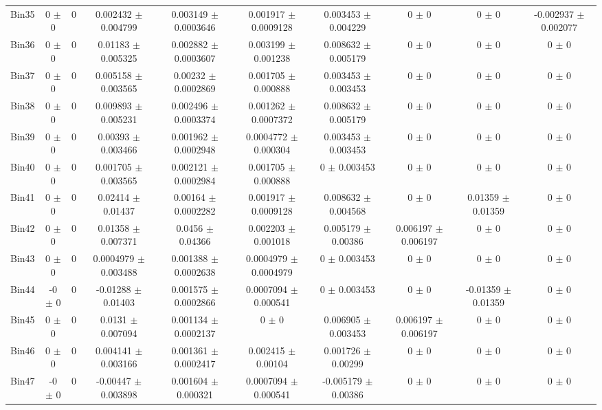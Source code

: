 \begin{tabular}{@{\extracolsep{4pt}}lccccccccc@{}}
     Bin35 & 0 $\pm$ 0 & 0 & 0.002432 $\pm$ 0.004799 & 0.003149 $\pm$ 0.0003646 & 0.001917 $\pm$ 0.0009128 & 0.003453 $\pm$ 0.004229 & 0 $\pm$ 0 & 0 $\pm$ 0 & -0.002937 $\pm$ 0.002077 \\ 
     Bin36 & 0 $\pm$ 0 & 0 & 0.01183 $\pm$ 0.005325 & 0.002882 $\pm$ 0.0003607 & 0.003199 $\pm$ 0.001238 & 0.008632 $\pm$ 0.005179 & 0 $\pm$ 0 & 0 $\pm$ 0 & 0 $\pm$ 0 \\ 
     Bin37 & 0 $\pm$ 0 & 0 & 0.005158 $\pm$ 0.003565 & 0.00232 $\pm$ 0.0002869 & 0.001705 $\pm$ 0.000888 & 0.003453 $\pm$ 0.003453 & 0 $\pm$ 0 & 0 $\pm$ 0 & 0 $\pm$ 0 \\ 
     Bin38 & 0 $\pm$ 0 & 0 & 0.009893 $\pm$ 0.005231 & 0.002496 $\pm$ 0.0003374 & 0.001262 $\pm$ 0.0007372 & 0.008632 $\pm$ 0.005179 & 0 $\pm$ 0 & 0 $\pm$ 0 & 0 $\pm$ 0 \\ 
     Bin39 & 0 $\pm$ 0 & 0 & 0.00393 $\pm$ 0.003466 & 0.001962 $\pm$ 0.0002948 & 0.0004772 $\pm$ 0.000304 & 0.003453 $\pm$ 0.003453 & 0 $\pm$ 0 & 0 $\pm$ 0 & 0 $\pm$ 0 \\ 
     Bin40 & 0 $\pm$ 0 & 0 & 0.001705 $\pm$ 0.003565 & 0.002121 $\pm$ 0.0002984 & 0.001705 $\pm$ 0.000888 & 0 $\pm$ 0.003453 & 0 $\pm$ 0 & 0 $\pm$ 0 & 0 $\pm$ 0 \\ 
     Bin41 & 0 $\pm$ 0 & 0 & 0.02414 $\pm$ 0.01437 & 0.00164 $\pm$ 0.0002282 & 0.001917 $\pm$ 0.0009128 & 0.008632 $\pm$ 0.004568 & 0 $\pm$ 0 & 0.01359 $\pm$ 0.01359 & 0 $\pm$ 0 \\ 
     Bin42 & 0 $\pm$ 0 & 0 & 0.01358 $\pm$ 0.007371 & 0.0456 $\pm$ 0.04366 & 0.002203 $\pm$ 0.001018 & 0.005179 $\pm$ 0.00386 & 0.006197 $\pm$ 0.006197 & 0 $\pm$ 0 & 0 $\pm$ 0 \\ 
     Bin43 & 0 $\pm$ 0 & 0 & 0.0004979 $\pm$ 0.003488 & 0.001388 $\pm$ 0.0002638 & 0.0004979 $\pm$ 0.0004979 & 0 $\pm$ 0.003453 & 0 $\pm$ 0 & 0 $\pm$ 0 & 0 $\pm$ 0 \\ 
     Bin44 & -0 $\pm$ 0 & 0 & -0.01288 $\pm$ 0.01403 & 0.001575 $\pm$ 0.0002866 & 0.0007094 $\pm$ 0.000541 & 0 $\pm$ 0.003453 & 0 $\pm$ 0 & -0.01359 $\pm$ 0.01359 & 0 $\pm$ 0 \\ 
     Bin45 & 0 $\pm$ 0 & 0 & 0.0131 $\pm$ 0.007094 & 0.001134 $\pm$ 0.0002137 & 0 $\pm$ 0 & 0.006905 $\pm$ 0.003453 & 0.006197 $\pm$ 0.006197 & 0 $\pm$ 0 & 0 $\pm$ 0 \\ 
     Bin46 & 0 $\pm$ 0 & 0 & 0.004141 $\pm$ 0.003166 & 0.001361 $\pm$ 0.0002417 & 0.002415 $\pm$ 0.00104 & 0.001726 $\pm$ 0.00299 & 0 $\pm$ 0 & 0 $\pm$ 0 & 0 $\pm$ 0 \\ 
     Bin47 & -0 $\pm$ 0 & 0 & -0.00447 $\pm$ 0.003898 & 0.001604 $\pm$ 0.000321 & 0.0007094 $\pm$ 0.000541 & -0.005179 $\pm$ 0.00386 & 0 $\pm$ 0 & 0 $\pm$ 0 & 0 $\pm$ 0 \\ 

\end{tabular}
